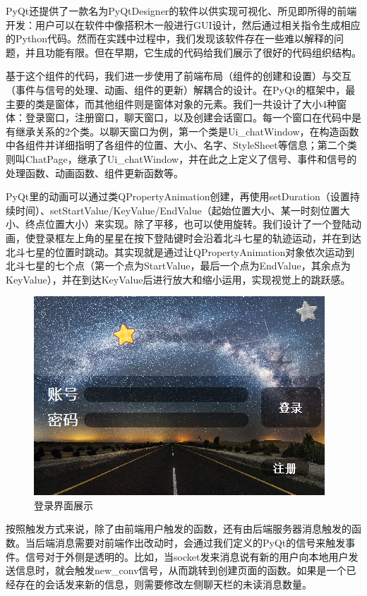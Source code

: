 \documentclass[12pt]{article} %
\begin{document}
\begin{sloppypar}
PyQt还提供了一款名为PyQtDesigner的软件以供实现可视化、所见即所得的前端开发：用户可以在软件中像搭积木一般进行GUI设计，然后通过相关指令生成相应的Python代码。然而在实践中过程中，我们发现该软件存在一些难以解释的问题，并且功能有限。但在早期，它生成的代码给我们展示了很好的代码组织结构。

基于这个组件的代码，我们进一步使用了前端布局（组件的创建和设置）与交互（事件与信号的处理、动画、组件的更新）解耦合的设计。在PyQt的框架中，最主要的类是窗体，而其他组件则是窗体对象的元素。我们一共设计了大小4种窗体：登录窗口，注册窗口，聊天窗口，以及创建会话窗口。每一个窗口在代码中是有继承关系的2个类。以聊天窗口为例，第一个类是Ui\_chatWindow，在构造函数中各组件并详细指明了各组件的位置、大小、名字、StyleSheet等信息；第二个类则叫ChatPage，继承了Ui\_chatWindow，并在此之上定义了信号、事件和信号的处理函数、动画函数、组件更新函数等。

PyQt里的动画可以通过类QPropertyAnimation创建，再使用setDuration（设置持续时间）、setStartValue/KeyValue/EndValue（起始位置大小、某一时刻位置大小、终点位置大小）来实现。除了平移，也可以使用旋转。我们设计了一个登陆动画，使登录框左上角的星星在按下登陆键时会沿着北斗七星的轨迹运动，并在到达北斗七星的位置时跳动。其实现就是通过让QPropertyAnimation对象依次运动到北斗七星的七个点（第一个点为StartValue，最后一个点为EndValue，其余点为KeyValue），并在到达KeyValue后进行放大和缩小运用，实现视觉上的跳跃感。

\begin{figure}[htbp]
	\centering
	\includegraphics[width=0.6\linewidth]{figure/reg.png}
	\caption{登录界面展示}
\end{figure}

按照触发方式来说，除了由前端用户触发的函数，还有由后端服务器消息触发的函数。当后端消息需要对前端作出改动时，会通过我们定义的PyQt的信号来触发事件。信号对于外侧是透明的。比如，当socket发来消息说有新的用户向本地用户发送信息时，就会触发new\_conv信号，从而跳转到创建页面的函数。如果是一个已经存在的会话发来新的信息，则需要修改左侧聊天栏的未读消息数量。


\end{sloppypar}
\end{document}
